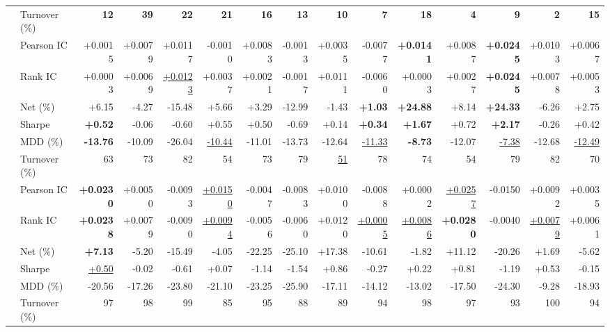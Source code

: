 \begin{table}[t]
{\begin{tabular}{llrrrrrrrrrrrrr}
 & Turnover (\%)& \textbf{12} & \textbf{39} & \textbf{22} & \textbf{21} & \textbf{16} & \textbf{13} & \textbf{10} & \textbf{7} & \textbf{18} & \textbf{4} & \textbf{9} & \textbf{2} & \textbf{15} \\
\addlinespace
\multirow{6}{*}{DLinear $194$}
 & Pearson IC   & +0.0015 & +0.0079 & +0.0117 & -0.0010 & +0.0083 & -0.0013 & +0.0035 & -0.0077 & \textbf{+0.0141} & +0.0087 & \textbf{+0.0245} & +0.0103 & +0.0067 \\
 & Rank IC      & +0.0003 & +0.0069 & \underline{+0.0123} & +0.0037 & +0.0021 & -0.0017 & +0.0111 & -0.0060 & +0.0003 & +0.0027 & \textbf{+0.0245} & +0.0078 & +0.0053 \\
 & Net (\%)     & +6.15 & -4.27 & -15.48 & +5.66 & +3.29 & -12.99 & -1.43 & \textbf{+1.03} & \textbf{+24.88} & +8.14 & \textbf{+24.33} & -6.26 & +2.75 \\
 & Sharpe       & \textbf{+0.52} & -0.06 & -0.60 & +0.55 & +0.50 & -0.69 & +0.14 & \textbf{+0.34} & \textbf{+1.67} & +0.72 & \textbf{+2.17} & -0.26 & +0.42 \\
 & MDD (\%)     & \textbf{-13.76} & -10.09 & -26.04 & \underline{-10.44} & -11.01 & -13.73 & -12.64 & \underline{-11.33} & \textbf{-8.73} & -12.07 & \underline{-7.38} & -12.68 & \underline{-12.49} \\
 & Turnover (\%)& 63 & 73 & 82 & 54 & 73 & 79 & \underline{51} & 78 & 74 & 54 & 79 & 82 & 70 \\
\addlinespace
\multirow{6}{*}{LSTM-i $679$}
 & Pearson IC   & \textbf{+0.0230} & +0.0050 & -0.0093 & \underline{+0.0150} & -0.0047 & -0.0083 & +0.0100 & -0.0088 & +0.0002 & \underline{+0.0257} & -0.0150 & +0.0092 & +0.0035 \\
 & Rank IC      & \textbf{+0.0238} & +0.0079 & -0.0090 & \underline{+0.0094} & -0.0056 & -0.0060 & +0.0120 & \underline{+0.0005} & \underline{+0.0086} & \textbf{+0.0280} & -0.0040 & \underline{+0.0079} & +0.0061 \\
 & Net (\%)     & \textbf{+7.13} & -5.20 & -15.49 & -4.05 & -22.25 & -25.10 & +17.38 & -10.61 & -1.82 & +11.12 & -20.26 & +1.69 & -5.62 \\
 & Sharpe       & \underline{+0.50} & -0.02 & -0.61 & +0.07 & -1.14 & -1.54 & +0.86 & -0.27 & +0.22 & +0.81 & -1.19 & +0.53 & -0.15 \\
 & MDD (\%)     & -20.56 & -17.26 & -23.80 & -21.10 & -23.25 & -25.90 & -17.11 & -14.12 & -13.02 & -17.50 & -24.30 & -9.28 & -18.93 \\
 & Turnover (\%)& 97 & 98 & 99 & 85 & 95 & 88 & 89 & 94 & 98 & 97 & 93 & 100 & 94 \\

\end{tabular}}
\end{table}
